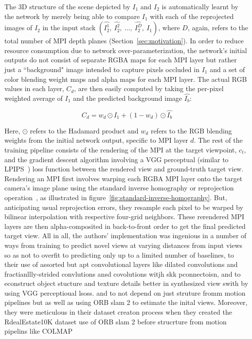 The 3D structure of the scene depicted by $I_1$ and $I_2$ is automatically learnt by the network by merely being able to compare $I_1$ with each of the reprojected images of $I_2$ in the input stack $(\hat{I_2^1},\ \hat{I_2^2},\ \ldots,\ \hat{I_2^D},\  I_1)$, where $D$, again, refers to the total number of MPI depth planes (Section~\ref{sec:motivation}). In order to reduce resource consumption due to network over-parameterization, the network's initial outputs do not consist of separate RGBA maps for each MPI layer but rather just a ``background" image intended to capture pixels occluded in $I_1$ and a set of color blending weight maps and alpha maps for each MPI layer. The actual RGB values in each layer, $C_d$, are then easily computed by taking the per-pixel weighted average of $I_1$ and the predicted background image $\hat{I_b}$:

\[ C_d = w_d \odot I_1 + (1 - w_d) \odot \hat{I_b} \]

Here, $\odot$ refers to the Hadamard product and $w_d$ refers to the RGB blending weights from the initial network output, specific to MPI layer $d$. The rest of the training pipeline consists of the rendering of the MPI at the target viewpoint, $c_t$, and the gradient descent algorithm involving a VGG perceptual (similar to LPIPS~\cite{zhang_unreasonable_2018}) loss function between the rendered view and ground-truth target view. Rendering an MPI first involves warping each RGBA MPI layer onto the target camera's image plane using the standard inverse homography or reprojection operation~\cite{hartley_multiple_2004}, as illustrated in figure~\ref{fig:standard-inverse-homography}. But, anticipating usual reprojection errors, they resample each pixel to be warped by bilinear interpolation with respective four-grid neighbors. These rerendered MPI layers are then alpha-composited in back-to-front order to get the final predicted target view. All in all, the authors' implementation was ingenious in a number of ways from training to predict novel views at varying distances from input views so as not to overfit to predicting only up to a limited number of baselines, to their use of assorted but apt convolutional layers like dilated convolutions and fractianllly-strided convlutions ansd covolutions witjh skk pconnectoisn, and to econstruct object stucture and texture details better in synthesized view swith by using VGG perceptioual lsoss. and to not depend on just struture fromm motion pipelines but as well as using ORB slam 2 to estimate the inital views. Moreover, they were meticulous in their dataset creaton process when they created the RdealEstate10K dataset use of ORB slam 2 before strucrture from motion pipelins like COLMAP  

